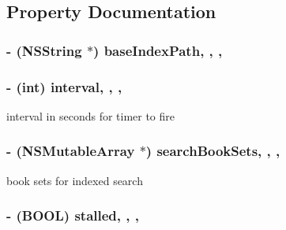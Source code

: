 \subsection{Property Documentation}
\hypertarget{interface_indexing_manager_ac10a75f5b8c0414f6934cc8848ec7872}{
\subsubsection[{base\-Index\-Path}]{\setlength{\rightskip}{0pt plus 5cm}-\/ (N\-S\-String $\ast$) base\-Index\-Path\hspace{0.3cm}{\ttfamily [read]}, {\ttfamily [write]}, {\ttfamily [atomic]}, {\ttfamily [retain]}}}\label{interface_indexing_manager_ac10a75f5b8c0414f6934cc8848ec7872}
\hypertarget{interface_indexing_manager_ae0c690118932b32ef40a74bb6a259acd}{
\subsubsection[{interval}]{\setlength{\rightskip}{0pt plus 5cm}-\/ (int) interval\hspace{0.3cm}{\ttfamily [read]}, {\ttfamily [write]}, {\ttfamily [atomic]}, {\ttfamily [assign]}}}\label{interface_indexing_manager_ae0c690118932b32ef40a74bb6a259acd}
interval in seconds for timer to fire \hypertarget{interface_indexing_manager_a493d6c6e3a4d8b94f3ac47ce56cf48db}{
\subsubsection[{search\-Book\-Sets}]{\setlength{\rightskip}{0pt plus 5cm}-\/ (N\-S\-Mutable\-Array $\ast$) search\-Book\-Sets\hspace{0.3cm}{\ttfamily [read]}, {\ttfamily [write]}, {\ttfamily [atomic]}, {\ttfamily [retain]}}}\label{interface_indexing_manager_a493d6c6e3a4d8b94f3ac47ce56cf48db}
book sets for indexed search \hypertarget{interface_indexing_manager_aa14a936f3cacdee52cdf8b3064ffebf3}{
\subsubsection[{stalled}]{\setlength{\rightskip}{0pt plus 5cm}-\/ (B\-O\-O\-L) stalled\hspace{0.3cm}{\ttfamily [read]}, {\ttfamily [write]}, {\ttfamily [atomic]}, {\ttfamily [assign]}}}\label{interface_indexing_manager_aa14a936f3cacdee52cdf8b3064ffebf3}
